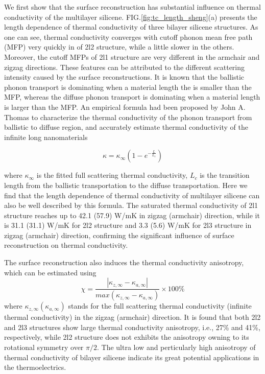 \documentclass[aps,prb,twocolumn,showpacs,amsmath,amssymb]{revtex4-1}
\begin{document}
We first show that the surface reconstruction has substantial influence on thermal conductivity of the multilayer silicene. 
FIG.\ref{fig:tc_length_sheng}(a) presents the length dependence of thermal conductivity of three bilayer silicene structures. 
As one can see, thermal conductivity converges with cutoff phonon mean free path (MFP) very quickly in of 2l2  structure, while a little slower in the others. Moreover, the cutoff MFPs of 2l1 structure are very different in the armchair and zigzag directions. These features can be attributed to the different scattering intensity caused by the surface reconstructions.  
It is known that the ballistic phonon transport is dominating  when a material length the is smaller than the MFP,  whereas the diffuse phonon transport is  dominating when a material length is larger than the MFP.  
An empirical formula had been proposed by John A. Thomas\cite{Thomas2010}  to characterize the thermal conductivity of the phonon transport from ballistic to diffuse region, and accurately estimate thermal conductivity of the infinite long nanomaterials

\begin{equation}
  \kappa = \kappa_\infty (1-e^{-\frac{L}{L_c}}) \label{eq:eq_nemd}
\end{equation}

where $\kappa_\infty$ is the fitted full scattering thermal conductivity, $L_c$ is the transition length from the ballistic transportation to the diffuse transportation. Here we find that the length dependence of thermal conductivity of multilayer silicene can also be well described by this  formula.
The saturated thermal conductivity of 2l1 structure reaches up to 42.1 (57.9) W/mK in zigzag (armchair) direction, while it is  31.1 (31.1) W/mK  for 2l2 structure and  3.3 (5.6)  W/mK for 2l3 structure in zigzag (armchair) direction, confirming the significant influence of surface reconstruction on thermal conductivity. 

The surface reconstruction also induces the thermal conductivity anisotropy, which can be estimated using 
\begin{equation}
  \chi=\frac{|\kappa_{z,\infty}-\kappa_{a,\infty} |}{ max⁡(\kappa_{z,\infty}-\kappa_{a,\infty} ) } \times 100 \%  \label{eq:eq_chi}
\end{equation}
where $ \kappa_{z,\infty} (\kappa_{a,\infty})$ stands for the full scattering thermal conductivity (infinite thermal conductivity) in the zigzag (armchair) direction. 
It is found that both 2l2 and 2l3 structures show large thermal conductivity anisotropy, i.e., 27\% and 41\%, respectively, while 2l2 structure does not exhibits the anisotropy owning to its rotational symmetry over $\pi/2$.  The ultra low and perticularly high anisotropy of thermal conductivity of bilayer silicene indicate its great potential applications in the thermoelectrics. 
\end{document}
